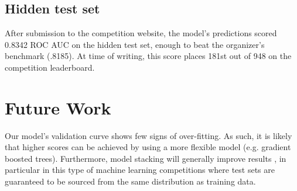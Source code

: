 \documentclass{article}[12pt]
\begin{document}
\subsection{Hidden test set}

After submission to the competition website, the model's predictions scored 0.8342 ROC AUC 
on the hidden test set, enough to beat the organizer's benchmark (.8185). 
At time of writing, this score places 181st out of 948 on the competition leaderboard. 

\section{Future Work}

Our  model's validation curve shows few signs of over-fitting. As such, it is likely that
higher scores can be achieved by using a more flexible model (e.g. gradient boosted trees).
Furthermore, model stacking will generally improve results \cite{elements}, in particular
in this type of machine learning competitions where test sets are guaranteed to be sourced
from the same distribution as training data.



\end{document}

